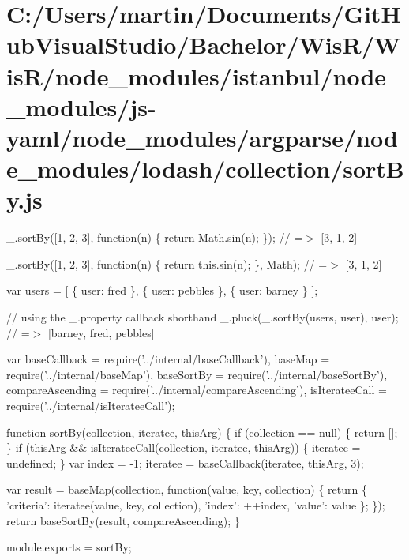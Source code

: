 \hypertarget{_c_1_2_users_2martin_2_documents_2_git_hub_visual_studio_2_bachelor_2_wis_r_2_wis_r_2node_modulee516393737479d31f22acf4aff3756b3}{}\section{C\+:/\+Users/martin/\+Documents/\+Git\+Hub\+Visual\+Studio/\+Bachelor/\+Wis\+R/\+Wis\+R/node\+\_\+modules/istanbul/node\+\_\+modules/js-\/yaml/node\+\_\+modules/argparse/node\+\_\+modules/lodash/collection/sort\+By.\+js}
\+\_\+.\+sort\+By(\mbox{[}1, 2, 3\mbox{]}, function(n) \{ return Math.\+sin(n); \}); // =$>$ \mbox{[}3, 1, 2\mbox{]}

\+\_\+.\+sort\+By(\mbox{[}1, 2, 3\mbox{]}, function(n) \{ return this.\+sin(n); \}, Math); // =$>$ \mbox{[}3, 1, 2\mbox{]}

var users = \mbox{[} \{ \textquotesingle{}user\textquotesingle{}\+: \textquotesingle{}fred\textquotesingle{} \}, \{ \textquotesingle{}user\textquotesingle{}\+: \textquotesingle{}pebbles\textquotesingle{} \}, \{ \textquotesingle{}user\textquotesingle{}\+: \textquotesingle{}barney\textquotesingle{} \} \mbox{]};

// using the {\ttfamily \+\_\+.\+property} callback shorthand \+\_\+.\+pluck(\+\_\+.\+sort\+By(users, \textquotesingle{}user\textquotesingle{}), \textquotesingle{}user\textquotesingle{}); // =$>$ \mbox{[}\textquotesingle{}barney\textquotesingle{}, \textquotesingle{}fred\textquotesingle{}, \textquotesingle{}pebbles\textquotesingle{}\mbox{]}


\begin{DoxyCodeInclude}
var baseCallback = require(\textcolor{stringliteral}{'../internal/baseCallback'}),
    baseMap = require(\textcolor{stringliteral}{'../internal/baseMap'}),
    baseSortBy = require(\textcolor{stringliteral}{'../internal/baseSortBy'}),
    compareAscending = require(\textcolor{stringliteral}{'../internal/compareAscending'}),
    isIterateeCall = require(\textcolor{stringliteral}{'../internal/isIterateeCall'});

\textcolor{keyword}{function} sortBy(collection, iteratee, thisArg) \{
  \textcolor{keywordflow}{if} (collection == null) \{
    \textcolor{keywordflow}{return} [];
  \}
  \textcolor{keywordflow}{if} (thisArg && isIterateeCall(collection, iteratee, thisArg)) \{
    iteratee = undefined;
  \}
  var index = -1;
  iteratee = baseCallback(iteratee, thisArg, 3);

  var result = baseMap(collection, \textcolor{keyword}{function}(value, key, collection) \{
    \textcolor{keywordflow}{return} \{ \textcolor{stringliteral}{'criteria'}: iteratee(value, key, collection), \textcolor{stringliteral}{'index'}: ++index, \textcolor{stringliteral}{'value'}: value \};
  \});
  \textcolor{keywordflow}{return} baseSortBy(result, compareAscending);
\}

module.exports = sortBy;
\end{DoxyCodeInclude}
 